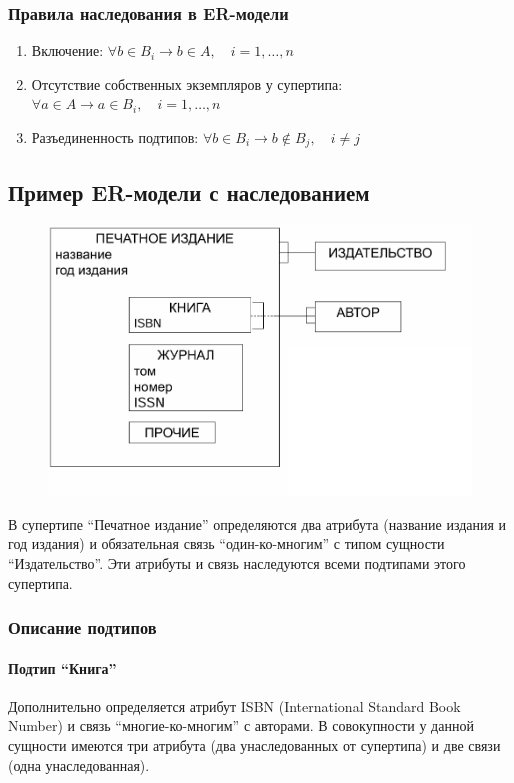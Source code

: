 \documentclass[a4paper,12pt]{article}
\begin{document}
\subsubsection{Правила наследования в ER-модели}
\begin{enumerate}
    \item Включение: $\forall b \in B_i \rightarrow b \in A, \quad i = 1, \ldots, n$
    \item Отсутствие собственных экземпляров у супертипа: $\forall a \in A \rightarrow a \in B_i, \quad i = 1, \ldots, n$
    \item Разъединенность подтипов: $\forall b \in B_i \rightarrow b \notin B_j, \quad i \neq j$
\end{enumerate}

\subsection{Пример ER-модели с наследованием}

\begin{figure}
    \centering
    \includegraphics[width=0.75\linewidth]{image.png}
    
    \label{fig:enter-label}
\end{figure}

В супертипе ``Печатное издание'' определяются два атрибута (название издания и год издания) и обязательная связь ``один-ко-многим'' с типом сущности ``Издательство''. Эти атрибуты и связь наследуются всеми подтипами этого супертипа.

\subsubsection{Описание подтипов}

\paragraph{Подтип ``Книга''} Дополнительно определяется атрибут ISBN (International Standard Book Number) и связь ``многие-ко-многим'' с авторами. В совокупности у данной сущности имеются три атрибута (два унаследованных от супертипа) и две связи (одна унаследованная).
\end{document}
